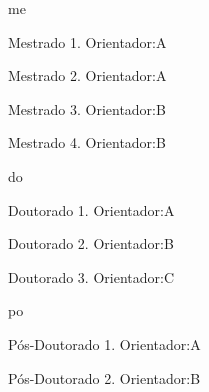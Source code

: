 \begin{orientacao}{me}
    \item Mestrado 1. Orientador:A
    \item Mestrado 2. Orientador:A
    \item Mestrado 3. Orientador:B
    \item Mestrado 4. Orientador:B
    
\end{orientacao}

\begin{orientacao}{do}
    \item Doutorado 1. Orientador:A
    \item Doutorado 2. Orientador:B
    \item Doutorado 3. Orientador:C
    
\end{orientacao}

\begin{orientacao}{po}
    \item Pós-Doutorado 1. Orientador:A
    \item Pós-Doutorado 2. Orientador:B
\end{orientacao}

\registercountingpp %
\resetorientations %
\clearpage
{}\label{orientacoes:pa}

